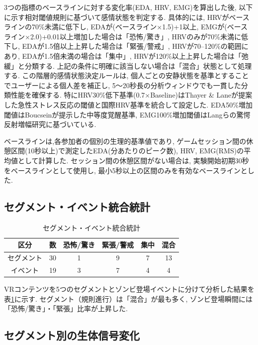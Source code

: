 \documentclass[a4paper]{jarticle}
\begin{document}
3つの指標のベースラインに対する変化率(EDA, HRV, EMG)を算出した後, 以下に示す相対閾値規則に基づいて感情状態を判定する. 具体的には, HRVがベースラインの70\%未満に低下し, EDAが(ベースライン×1.5)+1以上, EMGが(ベースライン×2.0)+0.01以上増加した場合は「恐怖/驚き」, HRVのみが70\%未満に低下し, EDAが1.5倍以上上昇した場合は「緊張/警戒」, HRVが70--120\%の範囲にあり, EDAが1.5倍未満の場合は「集中」, HRVが120\%以上上昇した場合は「弛緩」と分類する. 上記の条件に明確に該当しない場合は「混合」状態として処理する. この階層的感情状態決定ルールは, 個人ごとの安静状態を基準とすることでユーザーによる個人差を補正し, 5～20秒長の分析ウィンドウでも一貫した分類性能を確保する. 特にHRV30\%低下基準(0.7×Baseline)はThayer \& Laneが提案した急性ストレス反応の閾値\cite{bib12}と国際HRV基準\cite{bib06}を統合して設定した. EDA50\%増加閾値はBoucseinが提示した中等度覚醒基準\cite{bib08}, EMG100\%増加閾値はLangらの驚愕反射増幅研究\cite{bib11}に基づいている.

ベースラインは,各参加者の個別の生理的基準値であり, ゲームセッション間の休憩区間(10秒以上)で測定したEDA(分あたりのピーク数), HRV, EMG(RMS)の平均値として計算した. セッション間の休憩区間がない場合は, 実験開始初期30秒をベースラインとして使用し, 最小5秒以上の区間のみを有効なベースラインとした.
 
\subsection{セグメント・イベント統合統計}
\begin{table}[tp]
\caption{セグメント・イベント統合統計}
\label{table1}
\begin{center}\footnotesize
\def\arraystretch{1.1}
\begin{tabular}{|c|c|c|c|c|c|}\hline 
区分 & 数 & 恐怖/驚き & 緊張/警戒 & 集中 & 混合 \\ \hline
セグメント & 30 & 1 & 9 & 7 & 13 \\ \hline
イベント & 19 & 3 & 7 & 4 & 4 \\ \hline
\end{tabular}
\end{center}
\vspace*{-3mm}
\end{table}

VRコンテンツを5つのセグメントとゾンビ登場イベントに分けて分析した結果を表\ref{table1}に示す.
セグメント（規則進行）は「混合」が最も多く, ゾンビ登場瞬間には「恐怖/驚き」・「緊張」比率が上昇した.

\subsection{セグメント別の生体信号変化}
\end{document}
